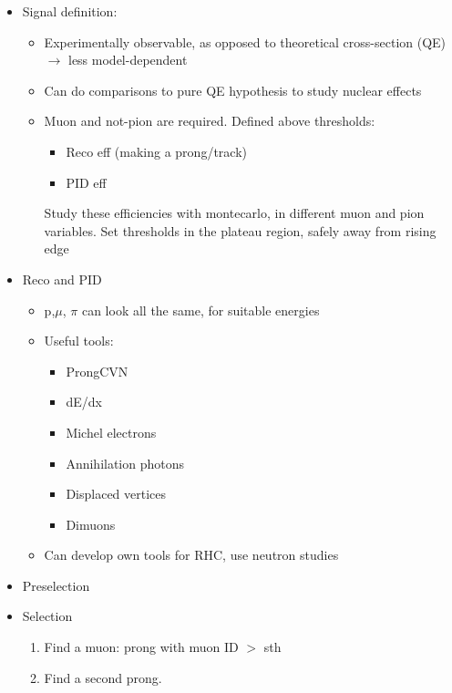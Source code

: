 \documentclass[11pt]{article}
\begin{document}
\begin{itemize}
	
    
    \item Signal definition: 
    	\begin{itemize}
    		\item Experimentally observable, as opposed to theoretical cross-section (QE) $\rightarrow$ less model-dependent
           	\item Can do comparisons to pure QE hypothesis to study nuclear effects
            \item Muon and not-pion are required. Defined above  thresholds:
    			\begin{itemize}
    				\item Reco eff (making a prong/track)
                    \item PID eff
    			\end{itemize}
                Study these efficiencies with montecarlo, in different muon and pion variables. Set thresholds in the plateau region, safely away from rising edge
            
    	\end{itemize}
    
    
    \item Reco and PID 
    	\begin{itemize}
    		\item p,$\mu$, $\pi$ can look all the same, for suitable energies
    		\item Useful tools:
    			\begin{itemize}
    				\item ProngCVN
                    \item dE/dx
                    \item Michel electrons
                    \item Annihilation photons
                    \item Displaced vertices
                    \item Dimuons
    			\end{itemize}
             \item Can develop own tools for RHC, use neutron studies
        \end{itemize}
	
    \item Preselection
    
    
    \item Selection
    	\begin{enumerate}
    		\item Find a muon: prong with muon ID $>$ sth
            \item Find a second prong. 
    	\end{enumerate}
    

\end{itemize}
\end{document}
